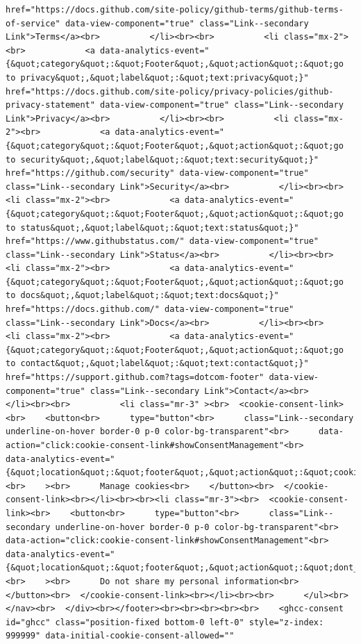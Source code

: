 \documentclass[
  letterpaper,
]{book}
\begin{document}
\begin{verbatim}
href="https://docs.github.com/site-policy/github-terms/github-terms-of-service" data-view-component="true" class="Link--secondary Link">Terms</a><br>          </li><br><br>          <li class="mx-2"><br>            <a data-analytics-event="{&quot;category&quot;:&quot;Footer&quot;,&quot;action&quot;:&quot;go to privacy&quot;,&quot;label&quot;:&quot;text:privacy&quot;}" href="https://docs.github.com/site-policy/privacy-policies/github-privacy-statement" data-view-component="true" class="Link--secondary Link">Privacy</a><br>          </li><br><br>          <li class="mx-2"><br>            <a data-analytics-event="{&quot;category&quot;:&quot;Footer&quot;,&quot;action&quot;:&quot;go to security&quot;,&quot;label&quot;:&quot;text:security&quot;}" href="https://github.com/security" data-view-component="true" class="Link--secondary Link">Security</a><br>          </li><br><br>          <li class="mx-2"><br>            <a data-analytics-event="{&quot;category&quot;:&quot;Footer&quot;,&quot;action&quot;:&quot;go to status&quot;,&quot;label&quot;:&quot;text:status&quot;}" href="https://www.githubstatus.com/" data-view-component="true" class="Link--secondary Link">Status</a><br>          </li><br><br>          <li class="mx-2"><br>            <a data-analytics-event="{&quot;category&quot;:&quot;Footer&quot;,&quot;action&quot;:&quot;go to docs&quot;,&quot;label&quot;:&quot;text:docs&quot;}" href="https://docs.github.com/" data-view-component="true" class="Link--secondary Link">Docs</a><br>          </li><br><br>          <li class="mx-2"><br>            <a data-analytics-event="{&quot;category&quot;:&quot;Footer&quot;,&quot;action&quot;:&quot;go to contact&quot;,&quot;label&quot;:&quot;text:contact&quot;}" href="https://support.github.com?tags=dotcom-footer" data-view-component="true" class="Link--secondary Link">Contact</a><br>          </li><br><br>          <li class="mr-3" ><br>  <cookie-consent-link><br>    <button<br>      type="button"<br>      class="Link--secondary underline-on-hover border-0 p-0 color-bg-transparent"<br>      data-action="click:cookie-consent-link#showConsentManagement"<br>      data-analytics-event="{&quot;location&quot;:&quot;footer&quot;,&quot;action&quot;:&quot;cookies&quot;,&quot;context&quot;:&quot;subfooter&quot;,&quot;tag&quot;:&quot;link&quot;,&quot;label&quot;:&quot;cookies_link_subfooter_footer&quot;}"<br>    ><br>      Manage cookies<br>    </button><br>  </cookie-consent-link><br></li><br><br><li class="mr-3"><br>  <cookie-consent-link><br>    <button<br>      type="button"<br>      class="Link--secondary underline-on-hover border-0 p-0 color-bg-transparent"<br>      data-action="click:cookie-consent-link#showConsentManagement"<br>      data-analytics-event="{&quot;location&quot;:&quot;footer&quot;,&quot;action&quot;:&quot;dont_share_info&quot;,&quot;context&quot;:&quot;subfooter&quot;,&quot;tag&quot;:&quot;link&quot;,&quot;label&quot;:&quot;dont_share_info_link_subfooter_footer&quot;}"<br>    ><br>      Do not share my personal information<br>    </button><br>  </cookie-consent-link><br></li><br><br>      </ul><br>    </nav><br>  </div><br></footer><br><br><br><br><br>    <ghcc-consent id="ghcc" class="position-fixed bottom-0 left-0" style="z-index: 999999" data-initial-cookie-consent-allowed="" 
\end{verbatim}
\end{document}
